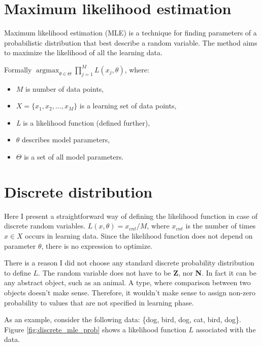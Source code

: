 \documentclass[thesis=B,english]{FITthesis}[2012/06/26]
\DeclareMathOperator*{\argmax}{argmax} %
\begin{document}
\section{Maximum likelihood estimation}
Maximum likelihood estimation (MLE) is a technique for finding parameters of a probabilistic distribution that best describe a random variable. The method aims to maximize the likelihood of all the learning data.

Formally $\argmax_{\theta \in \Theta} \prod_{j=1}^{M} L(x_j, \theta)$, where:

\begin{itemize}

\item $M$ is number of data points,
\item $X = \{x_1, x_2, \dots, x_M\}$ is a learning set of data points,
\item \emph{L} is a likelihood function (defined further),
\item $\theta$ describes model parameters,
\item $\Theta$ is a set of all model parameters.

\end{itemize}

\section{Discrete distribution}

Here I present a straightforward way of defining the likelihood function in case of discrete random variables. $L(x,\theta) = x_{cnt} / M$, where $x_{cnt}$ is the number of times $x \in X$ occurs in learning data. Since the likelihood function does not depend on parameter $\theta$, there is no expression to optimize.

There is a reason I did not choose any standard discrete probability distribution to define $L$. The random variable does not have to be \textbf Z, nor \textbf N. In fact it can be any abstract object, such as an animal. A type, where comparison between two objects doesn't make sense. Therefore, it wouldn't make sense to assign non-zero probability to values that are not specified in learning phase.

As an example, consider the following data: \{dog, bird, dog, cat, bird, dog\}. Figure \ref{fig:discrete_mle_prob} shows a likelihood function $L$ associated with the data.
\end{document}

